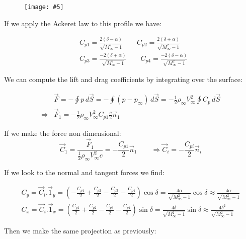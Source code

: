 \documentclass[british,french,11pt, a4paper, openany]{article}
\newcommand{\wrapfig}[6]{%
	\begin{figure}%
		\vspace{-5mm}%
		\texttt{[image: \#5]}%
		\captionof{figure}{}%
		\label{#6}%
	\end{figure}%
}
\begin{document}
\wrapfig{8}{r}{6.5}{0.1}{ch6/19}{fig:6.19}
If we apply the Ackeret law to this profile we have:

\begin{equation}
\begin{aligned}
&C_{p1} = \frac{2(\delta - \alpha)}{\sqrt{M_\infty^2 -1}} \qquad C_{p2} = \frac{2(\delta + \alpha)}{\sqrt{M_\infty^2 -1}} \\
&C_{p3} = \frac{-2(\delta + \alpha)}{\sqrt{M_\infty^2 -1}} \qquad C_{p4} = \frac{-2(\delta - \alpha)}{\sqrt{M_\infty^2 -1}}
\end{aligned}
\end{equation}

We can compute the lift and drag coefficients by integrating over the surface:

\begin{equation}
\begin{aligned}
&\vec{F} = -\oint p\, d\vec{S} = -\oint (p-p_\infty)\, d\vec{S} = -\frac{1}{2} \rho _\infty V_\infty ^2 \oint C_p\, d\vec{S}\\
\Rightarrow &\vec{F}_1 = -\frac{1}{2} \rho _\infty V_\infty ^2 C_{p1} \frac{c}{2} \vec{n}_1
\end{aligned}
\end{equation}

If we make the force non dimensional: 
\begin{equation}
\vec{C}_1 = \frac{\vec{F}_1}{\frac{1}{2}\rho _\infty V_\infty ^2 c} = -\frac{C_{p1}}{2} \vec{n}_1 \qquad \Rightarrow \vec{C}_i = -\frac{C_{pi}}{2} \vec{n}_i
\end{equation}

If we look to the normal and tangent forces we find: 

\begin{equation}
\begin{aligned}
C_y = \vec{C}_i .\vec{1}_y = \left(-\frac{C_{p1}}{2} + \frac{C_{p2}}{2} -\frac{C_{p3}}{2} +\frac{C_{p4}}{2} \right) \cos \delta= \frac{4\alpha }{\sqrt{M_\infty ^2 -1}} \cos \delta \approx \frac{4\alpha }{\sqrt{M_\infty ^2 -1}}\\
C_x = \vec{C}_i .\vec{1}_x = \left(\frac{C_{p1}}{2} + \frac{C_{p2}}{2} -\frac{C_{p3}}{2} -\frac{C_{p4}}{2} \right) \sin \delta = \frac{4\delta }{\sqrt{M_\infty ^2 -1}} \sin \delta \approx \frac{4\delta ^2}{\sqrt{M_\infty ^2 -1}}
\end{aligned}
\end{equation}

Then we make the same projection as previously: 
\end{document}
